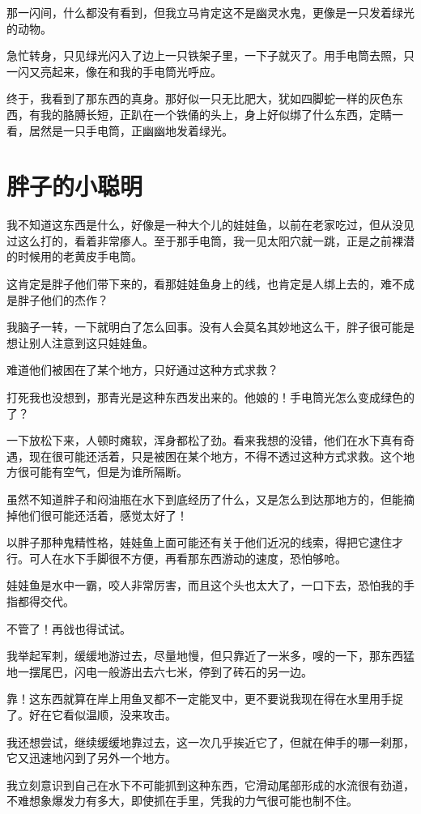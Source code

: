 那一闪间，什么都没有看到，但我立马肯定这不是幽灵水鬼，更像是一只发着绿光的动物。

急忙转身，只见绿光闪入了边上一只铁架子里，一下子就灭了。用手电筒去照，只一闪又亮起来，像在和我的手电筒光呼应。

终于，我看到了那东西的真身。那好似一只无比肥大，犹如四脚蛇一样的灰色东西，有我的胳膊长短，正趴在一个铁俑的头上，身上好似绑了什么东西，定睛一看，居然是一只手电筒，正幽幽地发着绿光。

\chapter{胖子的小聪明}

我不知道这东西是什么，好像是一种大个儿的娃娃鱼，以前在老家吃过，但从没见过这么打的，看着非常瘆人。至于那手电筒，我一见太阳穴就一跳，正是之前裸潜的时候用的老黄皮手电筒。

这肯定是胖子他们带下来的，看那娃娃鱼身上的线，也肯定是人绑上去的，难不成是胖子他们的杰作？

我脑子一转，一下就明白了怎么回事。没有人会莫名其妙地这么干，胖子很可能是想让别人注意到这只娃娃鱼。

难道他们被困在了某个地方，只好通过这种方式求救？

打死我也没想到，那青光是这种东西发出来的。他娘的！手电筒光怎么变成绿色的了？

一下放松下来，人顿时瘫软，浑身都松了劲。看来我想的没错，他们在水下真有奇遇，现在很可能还活着，只是被困在某个地方，不得不透过这种方式求救。这个地方很可能有空气，但是为谁所隔断。

虽然不知道胖子和闷油瓶在水下到底经历了什么，又是怎么到达那地方的，但能摘掉他们很可能还活着，感觉太好了！

以胖子那种鬼精性格，娃娃鱼上面可能还有关于他们近况的线索，得把它逮住才行。可人在水下手脚很不方便，再看那东西游动的速度，恐怕够呛。

娃娃鱼是水中一霸，咬人非常厉害，而且这个头也太大了，一口下去，恐怕我的手指都得交代。

不管了！再戗也得试试。

我举起军刺，缓缓地游过去，尽量地慢，但只靠近了一米多，嗖的一下，那东西猛地一摆尾巴，闪电一般游出去六七米，停到了砖石的另一边。

靠！这东西就算在岸上用鱼叉都不一定能叉中，更不要说我现在得在水里用手捉了。好在它看似温顺，没来攻击。

我还想尝试，继续缓缓地靠过去，这一次几乎挨近它了，但就在伸手的哪一刹那，它又迅速地闪到了另外一个地方。

我立刻意识到自己在水下不可能抓到这种东西，它滑动尾部形成的水流很有劲道，不难想象爆发力有多大，即使抓在手里，凭我的力气很可能也制不住。

